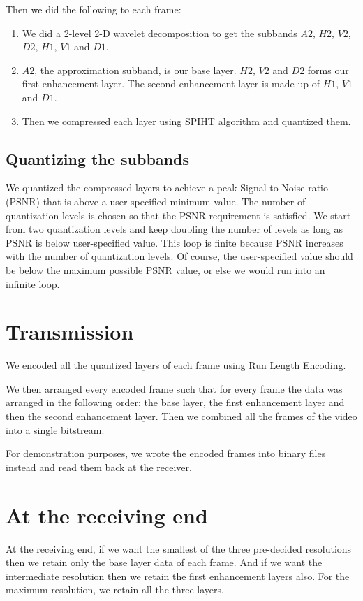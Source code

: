 \documentclass[10pt,twocolumn]{article}
\begin{document}
Then we did the following to each frame:
\begin{enumerate}
    \item We did a 2-level 2-D wavelet decomposition to get the subbands $A2$, $H2$, $V2$, $D2$, $H1$, $V1$ and $D1$.
    \item $A2$, the approximation subband, is our base layer. $H2$, $V2$ and $D2$ forms our first enhancement layer. The second enhancement layer is made up of $H1$, $V1$ and $D1$.
    \item Then we compressed each layer using SPIHT\cite{amirSaid1996} algorithm and quantized them.
\end{enumerate}

\subsection*{Quantizing the subbands}

We quantized the compressed layers to achieve a peak Signal-to-Noise ratio (PSNR) that is above a user-specified minimum value. The number of quantization levels is chosen so that the PSNR requirement is satisfied. We start from two quantization levels and keep doubling the number of levels as long as PSNR is below user-specified value. This loop is finite because PSNR increases with the number of quantization levels. Of course, the user-specified value should be below the maximum possible PSNR value, or else we would run into an infinite loop.

\section{Transmission}

We encoded all the quantized layers of each frame using Run Length Encoding.

We then arranged every encoded frame such that for every frame the data was arranged in the following order: the base layer, the first enhancement layer and then the second enhancement layer. Then we combined all the frames of the video into a single bitstream.

For demonstration purposes, we wrote the encoded frames into binary files instead and read them back at the receiver.

\section{At the receiving end}

At the receiving end, if we want the smallest of the three pre-decided resolutions then we retain only the base layer data of each frame. And if we want the intermediate resolution then we retain the first enhancement layers also. For the maximum resolution, we retain all the three layers.
\end{document}
